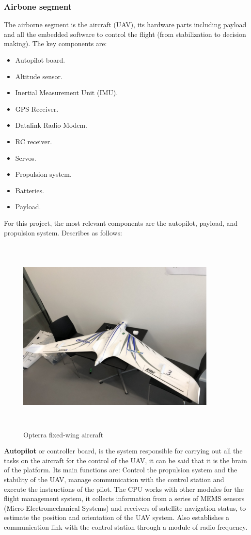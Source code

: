 \subsubsection{Airbone segment}
The airborne segment is the aircraft (UAV), its hardware parts including payload and all the embedded software to control the flight (from stabilization to decision making). The key components are:
\begin{itemize}
    \item Autopilot board.
    \item Altitude sensor.
    \item Inertial Measurement Unit (IMU).
    \item GPS Receiver.
    \item Datalink Radio Modem.
    \item RC receiver.
    \item Servos.
    \item Propulsion system.
    \item Batteries.
    \item Payload.
\end{itemize}
For this project, the most relevant components are the autopilot, payload, and propulsion system. Describes as follows:
\begin{figure}[H]
\centering
\includegraphics[width=10cm,height=10cm,keepaspectratio]{imagenes/opterra.jpg}
\caption{Opterra fixed-wing aircraft}
\label{fig:Optera}
\end{figure}
\textbf{ Autopilot} or controller board, is the system responsible for carrying out all the tasks on the aircraft for the control of the UAV, it can be said that it is the brain of the platform. Its main functions are: Control the propulsion system and the stability of the UAV, manage communication with the control station and execute the instructions of the pilot. The CPU works with other modules for the flight management system, it collects information from a series of MEMS sensors (Micro-Electromechanical Systems) and receivers of satellite navigation status, to estimate the position and orientation of the UAV system. Also establishes a communication link with the control station through a module of radio frequency.\cite{Edgar}

